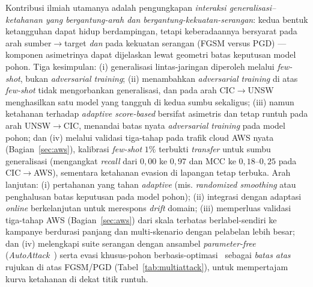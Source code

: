\documentclass[11pt,a4paper]{article}
\begin{document}
\noindent Kontribusi
ilmiah utamanya adalah pengungkapan \emph{interaksi generalisasi--ketahanan yang
bergantung-arah dan bergantung-kekuatan-serangan}: kedua bentuk ketangguhan dapat
hidup berdampingan, tetapi keberadaannya bersyarat pada arah sumber$\rightarrow$target
\emph{dan} pada kekuatan serangan (FGSM versus PGD) --- komponen asimetrinya dapat
dijelaskan lewat geometri batas keputusan model pohon. Tiga kesimpulan:
(i) generalisasi lintas-jaringan diperoleh melalui \emph{few-shot}, bukan
\emph{adversarial training}; (ii) menambahkan \emph{adversarial training} di atas
\emph{few-shot} tidak mengorbankan generalisasi, dan pada arah
CIC$\rightarrow$UNSW menghasilkan satu model yang tangguh di kedua sumbu sekaligus;
(iii) namun ketahanan terhadap \emph{adaptive score-based} bersifat asimetris dan
tetap runtuh pada arah UNSW$\rightarrow$CIC, menandai batas nyata
\emph{adversarial training} pada model pohon; dan (iv) melalui validasi tiga-tahap
pada trafik cloud AWS nyata (Bagian~\ref{sec:aws}), kalibrasi \emph{few-shot} $1\%$
terbukti \emph{transfer} untuk sumbu generalisasi (mengangkat \emph{recall} dari
$0{,}00$ ke $0{,}97$ dan MCC ke $0{,}18$--$0{,}25$ pada CIC$\rightarrow$AWS),
sementara ketahanan evasion di lapangan tetap terbuka. Arah lanjutan: (i) pertahanan yang
tahan \emph{adaptive} (mis. \emph{randomized smoothing} atau penghalusan batas
keputusan pada model pohon); (ii) integrasi dengan adaptasi \emph{online}
berkelanjutan untuk merespons \emph{drift} domain; (iii) memperluas validasi tiga-tahap AWS
(Bagian~\ref{sec:aws}) dari skala terbatas berlabel-sendiri ke kampanye berdurasi
panjang dan multi-skenario dengan pelabelan lebih besar; dan
(iv) melengkapi suite serangan dengan ansambel \emph{parameter-free}
(\emph{AutoAttack}~\cite{croce2020autoattack}) serta evasi khusus-pohon
berbasis-optimasi~\cite{kantchelian2016} sebagai \emph{batas atas} rujukan di atas
FGSM/PGD (Tabel~\ref{tab:multiattack}), untuk mempertajam kurva ketahanan di dekat
titik runtuh.
\end{document}
